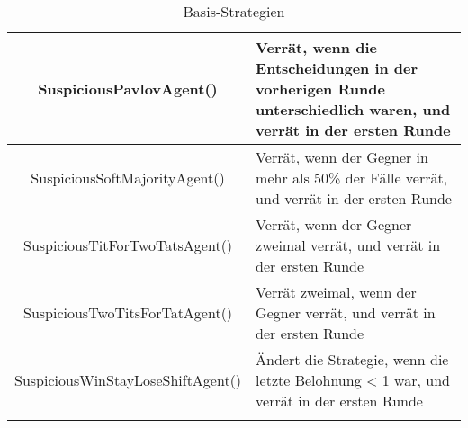 \begin{longtable}{|c|m{7cm}|}
    \hline
    SuspiciousPavlovAgent() & Verrät, wenn die Entscheidungen in der vorherigen Runde unterschiedlich waren, und verrät in der ersten Runde \\
    \hline
    SuspiciousSoftMajorityAgent() & Verrät, wenn der Gegner in mehr als 50\% der Fälle verrät, und verrät in der ersten Runde \\
    \hline
    SuspiciousTitForTwoTatsAgent() & Verrät, wenn der Gegner zweimal verrät, und verrät in der ersten Runde \\
    \hline
    SuspiciousTwoTitsForTatAgent() & Verrät zweimal, wenn der Gegner verrät, und verrät in der ersten Runde \\
    \hline
    SuspiciousWinStayLoseShiftAgent() & Ändert die Strategie, wenn die letzte Belohnung < 1 war, und verrät in der ersten Runde \\
    \hline
\caption{Basis-Strategien}
\label{table:basestrategies}
\end{longtable}

